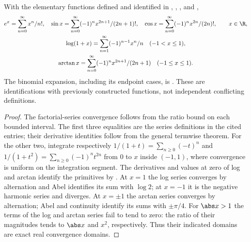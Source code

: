 \begin{theorem}
With the elementary functions defined and identified in , , , and ,
\[\begin{gathered}
e^x=\sum_{n=0}^\infty x^n/n!,\quad
\sin x=\sum_{n=0}^\infty(-1)^n x^{2n+1}/(2n+1)!,\quad
\cos x=\sum_{n=0}^\infty(-1)^n x^{2n}/(2n)!,\qquad x\in\R,\\
\log(1+x)=\sum_{n=1}^\infty(-1)^{n-1}x^n/n\quad(-1<x\leq1),\\
\arctan x=\sum_{n=0}^\infty(-1)^nx^{2n+1}/(2n+1)\quad(-1\leq x\leq1).
\end{gathered}\]
The binomial expansion, including its endpoint cases, is . These are identifications with previously constructed functions, not independent conflicting definitions.
\end{theorem}
\begin{proof}
The factorial-series convergence follows from the ratio bound on each bounded interval. The first three equalities are the series definitions in the cited entries; their derivative identities follow from the general termwise theorem. For the other two, integrate respectively $1/(1+t)=\sum_{n\geq0}(-t)^n$ and $1/(1+t^2)=\sum_{n\geq0}(-1)^nt^{2n}$ from $0$ to $x$ inside $(-1,1)$, where convergence is uniform on the integration segment. The derivatives and values at zero of log and arctan identify the primitives by . At $x=1$ the log series converges by alternation and Abel identifies its sum with $\log2$; at $x=-1$ it is the negative harmonic series and diverges. At $x=\pm1$ the arctan series converges by alternation; Abel and continuity identify its sums with $\pm\pi/4$. For $\abs x>1$ the terms of the log and arctan series fail to tend to zero: the ratio of their magnitudes tends to $\abs x$ and $x^2$, respectively. Thus their indicated domains are exact real convergence domains.
\end{proof}
